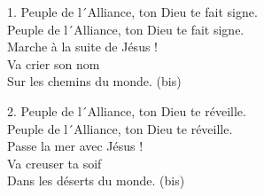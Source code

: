 1.
Peuple de l´Alliance, ton Dieu te fait signe.\\
Peuple de l´Alliance, ton Dieu te fait signe.\\
Marche à la suite de Jésus !\\
Va crier son nom\\
Sur les chemins du monde. (bis)

2.
Peuple de l´Alliance, ton Dieu te réveille.\\
Peuple de l´Alliance, ton Dieu te réveille.\\
Passe la mer avec Jésus !\\
Va creuser ta soif\\
Dans les déserts du monde. (bis)
